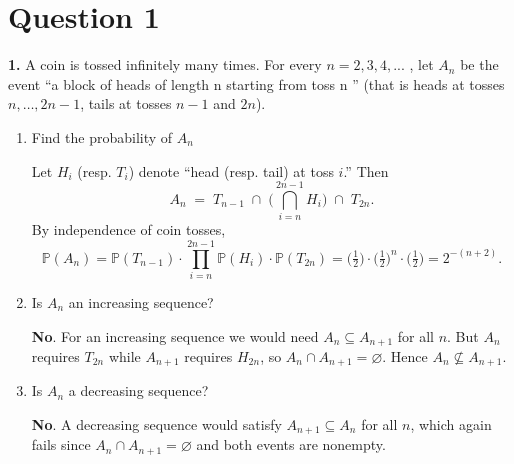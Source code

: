 \documentclass[dvipsnames,11pt]{article}
\begin{document}
\section*{Question 1}

\textbf{1.} A coin is tossed infinitely many times. For every $n=2,3,4,...$ , let $A_n$ be the event “a block of
heads of length n starting from toss n ” (that is heads at tosses $n,\dots,2n-1$, tails at tosses $n-1$ and $2n$).\\

    \begin{enumerate}[label=\alph*.]
        \item Find the probability of $A_n$
    
            \begin{solution}
    
                Let $H_i$ (resp. $T_i$) denote “head (resp. tail) at toss $i$.” Then
                \[
                A_n \;=\; T_{n-1}\;\cap\;\Big(\bigcap_{i=n}^{2n-1} H_i\Big)\;\cap\;T_{2n}.
                \]
                By independence of coin tosses, 
                \[
                \mathbb P(A_n)=\mathbb P(T_{n-1})\cdot\prod_{i=n}^{2n-1}\mathbb P(H_i)\cdot \mathbb P(T_{2n}) = \Big(\tfrac12\Big)\cdot\Big(\tfrac12\Big)^{n}\cdot\Big(\tfrac12\Big)=2^{-(n+2)}.
                \]
                
            \end{solution}
            
        \item Is $A_n$ an increasing sequence?
    
            \begin{solution}
    
                \textbf{No}. For an increasing sequence we would need $A_n\subseteq A_{n+1}$ for all $n$. But $A_n$ requires $T_{2n}$ while $A_{n+1}$ requires $H_{2n}$, so $A_n\cap A_{n+1}=\varnothing$. Hence $A_n\not\subseteq A_{n+1}$.
                
            \end{solution}
            
        \item Is $A_n$ a decreasing sequence?
    
            \begin{solution}
    
                \textbf{No}. A decreasing sequence would satisfy $A_{n+1}\subseteq A_n$ for all $n$, which again fails since $A_n\cap A_{n+1}=\varnothing$ and both events are nonempty.
                

\end{solution}
\end{enumerate}
\end{document}
